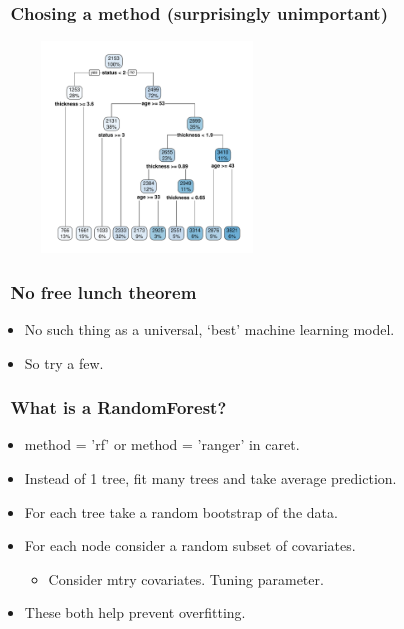 \documentclass[handout, aspectratio = 169]{beamer}
\begin{document}
\begin{frame}
\frametitle{\insertframenumber~Chosing a method (surprisingly unimportant)}
\vspace{-4mm}
\begin{figure}
    \includegraphics[width = 0.5\textwidth]{rpart_depth6.pdf}
\end{figure} 

\end{frame} 



\begin{frame}
\frametitle{\insertframenumber~No free lunch theorem}
\begin{itemize}
\item No such thing as a universal, `best' machine learning model.
\item So try a few.
\end{itemize}

\end{frame} 



\begin{frame}
\frametitle{\insertframenumber~What is a RandomForest?}

\begin{itemize}
\item method = 'rf' or method = 'ranger' in caret.
\item Instead of 1 tree, fit many trees and take average prediction.
\item For each tree take a random bootstrap of the data.
\item For each node consider a random subset of covariates.
	\begin{itemize}
	\item Consider mtry covariates. Tuning parameter.
	\end{itemize}
\item These both help prevent overfitting.
\end{itemize}
\end{frame} 
\end{document}
